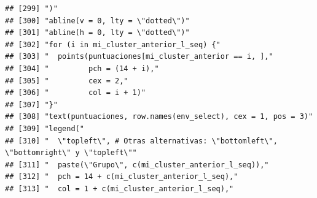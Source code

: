 \documentclass[11pt,]{article}
\begin{document}
\begin{verbatim}
## [299] ")"                                                                                                                                                                     
## [300] "abline(v = 0, lty = \"dotted\")"                                                                                                                                       
## [301] "abline(h = 0, lty = \"dotted\")"                                                                                                                                       
## [302] "for (i in mi_cluster_anterior_l_seq) {"                                                                                                                                
## [303] "  points(puntuaciones[mi_cluster_anterior == i, ],"                                                                                                                    
## [304] "         pch = (14 + i),"                                                                                                                                              
## [305] "         cex = 2,"                                                                                                                                                     
## [306] "         col = i + 1)"                                                                                                                                                 
## [307] "}"                                                                                                                                                                     
## [308] "text(puntuaciones, row.names(env_select), cex = 1, pos = 3)"                                                                                                           
## [309] "legend("                                                                                                                                                               
## [310] "  \"topleft\", # Otras alternativas: \"bottomleft\", \"bottomright\" y \"topleft\""                                                                                    
## [311] "  paste(\"Grupo\", c(mi_cluster_anterior_l_seq)),"                                                                                                                     
## [312] "  pch = 14 + c(mi_cluster_anterior_l_seq),"                                                                                                                            
## [313] "  col = 1 + c(mi_cluster_anterior_l_seq),"                                                                                                                             

\end{verbatim}
\end{document}
